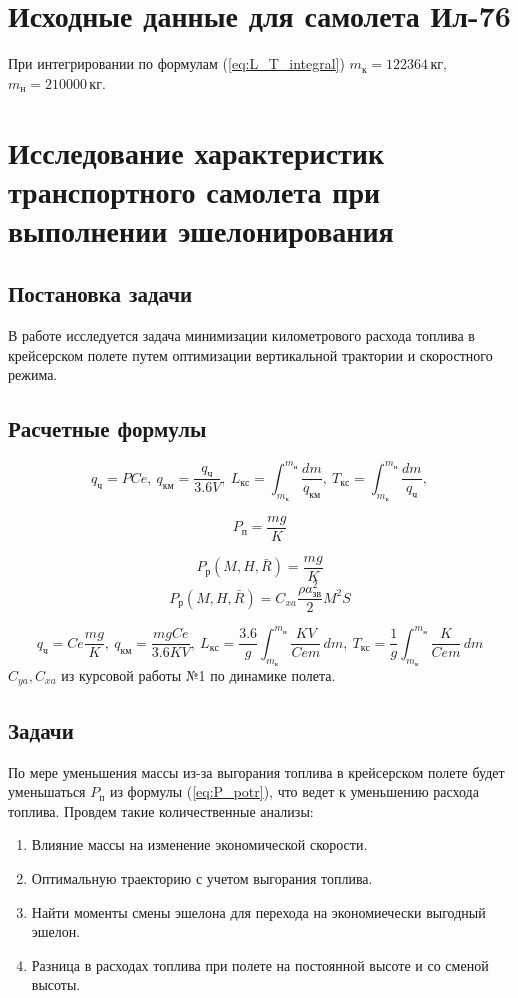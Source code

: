 \documentclass[bachelor,subf,14pt, substylefile = spbu.rtx]{disser}
\newcommand*{\titleASU}{\begingroup

\begin{center}
\large Федеральное агентство по образованию\\
МОСКОВСКИЙ АВИАЦИОННЫЙ ИНСТИТУТ\\
(Национальный исследовательский университет)\\

\noindent\rule{\textwidth}{0.4pt}\\
Кафедра 106

\vspace{5cm}

\large{КУРСОВАЯ РАБОТА}\\
\normalsize{по дисциплине «Динамика полета»}\\
\normalsize{Тема: <<>>}

\vspace{2.8cm}
\end{center}

\begin{flushright}
\normalsize Выполнил Москвитин Андрей\\
Студент гр. М1О-403Б-18\\
\end{flushright}
\begin{center}

\vfill

Москва\\
2022\\

\end{center}
\pagestyle{empty}
\newpage
\endgroup}
\begin{document}
\section{Исходные данные для самолета Ил-76}
При интегрировании по формулам (\ref{eq:L_T_integral}) $m_{к}=122364 \, кг$, $m_{н}=210000 \, кг$.

\section{Исследование характеристик транспортного самолета при выполнении эшелонирования}
\subsection{Постановка задачи}
В работе исследуется задача минимизации километрового расхода топлива в крейсерском полете путем оптимизации вертикальной трактории и скоростного режима.  

\subsection{Расчетные формулы} 
\begin{equation}
\label{eq:L_T_integral}
q_{ч}=P Ce, \: q_{км}=\frac{q_{ч}}{3.6 V}, \: L_{кс}= \int_{m_к}^{m_н} \frac{dm}{q_{км}},\: T_{кс}= \int_{m_к}^{m_н} \frac{dm}{q_{ч}},
\end{equation}

\begin{equation}
\label{eq:P_potr}
P_п = \frac{mg}{K} 
\end{equation}

\[
P_р(M, H, \bar{R})=\frac{mg}{K} 
\]
\[
P_р(M, H, \bar{ R }) = C_{xa} \frac{\rho a_{зв}^2}{2}M^2 S   
\]

\[ 
q_ч = Ce \frac{mg}{K}, \: q_{км} = \frac{mg Ce}{3.6KV}, \: L_{кс}= \frac{3.6}{g}\int_{m_к}^{m_н} \frac{KV}{Ce m}
\, dm, \: T_{кс}= \frac{1}{g} \int_{m_к}^{m_н} \frac{K}{Ce m}\, dm
\]
$C_{ya}, C_{xa}$ из курсовой работы №1 по динамике полета.

\subsection{Задачи}
По мере уменьшения массы из-за выгорания топлива в крейсерском полете будет уменьшаться $P_п$ из формулы (\ref{eq:P_potr}), что ведет к уменьшению расхода топлива.  
Провдем такие количественные анализы:  
\begin{enumerate}
    \item Влияние массы на изменение экономической скорости.  
    \item Оптимальную траекторию с учетом выгорания топлива.
    \item Найти моменты смены эшелона для перехода на экономиечески выгодный эшелон. 
    \item Разница в расходах топлива при полете на постоянной высоте и со сменой высоты.
\end{enumerate}
\end{document}
